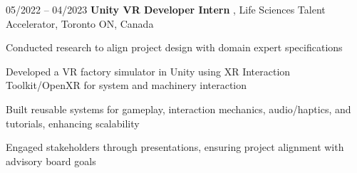 \begin{twocolentry}{
    05/2022 – 04/2023
}
    \textbf{Unity VR Developer Intern }, Life Sciences Talent Accelerator, Toronto ON, Canada\end{twocolentry}

\vspace{0.10 cm}
\begin{onecolentry}
    \begin{highlights}
        \item Conducted research to align project design with domain expert specifications 
        \item Developed a VR factory simulator in Unity using XR Interaction Toolkit/OpenXR for system and machinery interaction
        \item Built reusable systems for gameplay, interaction mechanics, audio/haptics, and tutorials, enhancing scalability
        \item Engaged stakeholders through presentations, ensuring project alignment with advisory board goals
    \end{highlights}
\end{onecolentry}